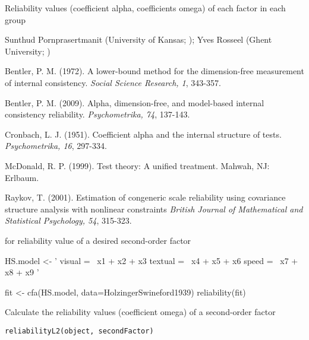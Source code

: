 \documentclass[a4paper]{book}
\begin{document}
%
\begin{Value}
Reliability values (coefficient alpha, coefficients omega) of each factor in each group
\end{Value}
%
\begin{Author}\relax
Sunthud Pornprasertmanit (University of Kansas; ); Yves Rosseel (Ghent University; )
\end{Author}
%
\begin{References}\relax
Bentler, P. M. (1972). A lower-bound method for the dimension-free measurement of internal consistency. \emph{Social Science Research, 1}, 343-357.

Bentler, P. M. (2009). Alpha, dimension-free, and model-based internal consistency reliability. \emph{Psychometrika, 74}, 137-143.

Cronbach, L. J. (1951). Coefficient alpha and the internal structure of tests. \emph{Psychometrika, 16}, 297-334. 

McDonald, R. P. (1999). Test theory: A unified treatment. Mahwah, NJ: Erlbaum.

Raykov, T. (2001). Estimation of congeneric scale reliability using covariance structure analysis with nonlinear constraints \emph{British Journal of Mathematical and Statistical Psychology, 54}, 315-323.
\end{References}
%
\begin{SeeAlso}\relax
{} for reliability value of a desired second-order factor
\end{SeeAlso}
%
\begin{Examples}
\begin{ExampleCode}
HS.model <- ' visual  =~ x1 + x2 + x3
              textual =~ x4 + x5 + x6
              speed   =~ x7 + x8 + x9 '

fit <- cfa(HS.model, data=HolzingerSwineford1939)
reliability(fit)
\end{ExampleCode}
\end{Examples}
%
\begin{Description}\relax
Calculate the reliability values (coefficient omega) of a second-order factor
\end{Description}
%
\begin{Usage}
\begin{verbatim}
reliabilityL2(object, secondFactor)
\end{verbatim}
\end{Usage}
\end{document}
